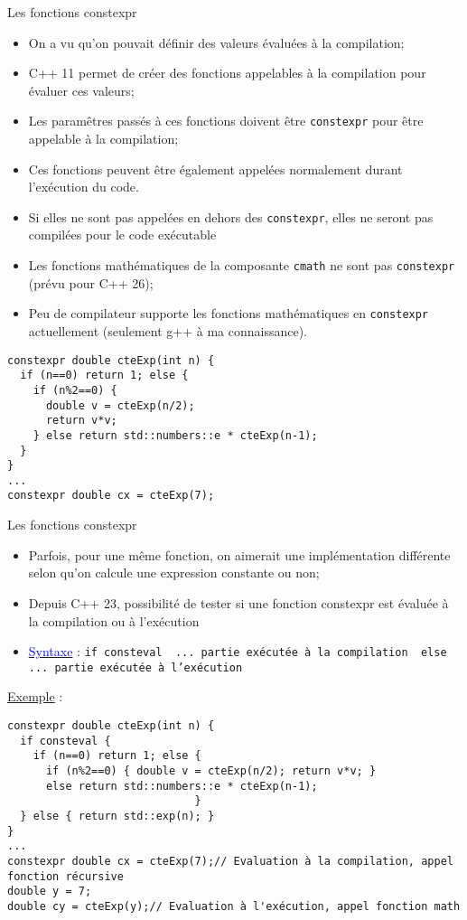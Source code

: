\documentclass[compress,10pt,aspectratio=169]{beamer}
\begin{document}
\begin{frame}[fragile]{Les fonctions constexpr}
  \scriptsize
  
\begin{itemize}
\item On a vu qu'on pouvait définir des valeurs évaluées à la compilation;
\item C++ 11 permet de créer des fonctions appelables à la compilation pour évaluer ces valeurs;
\item Les paramêtres passés à ces fonctions doivent être \texttt{constexpr} pour être appelable à la compilation;
\item Ces fonctions peuvent être également appelées normalement durant l'exécution du code. 
\item Si elles ne sont pas appelées en dehors des \texttt{constexpr}, elles ne seront pas compilées pour le code exécutable
\item Les fonctions mathématiques de la composante \texttt{cmath} ne sont pas \texttt{constexpr} (prévu pour C++ 26);
\item Peu de compilateur supporte les fonctions mathématiques en \texttt{constexpr} actuellement (seulement g++ à ma connaissance).
\end{itemize}

\begin{verbatim}
constexpr double cteExp(int n) {
  if (n==0) return 1; else {
    if (n%2==0) {
      double v = cteExp(n/2);
      return v*v;
    } else return std::numbers::e * cteExp(n-1);
  }
}
...   
constexpr double cx = cteExp(7);
\end{verbatim}

\end{frame}
  
\begin{frame}[fragile]{Les fonctions constexpr}
  \scriptsize
  
  \begin{itemize}
\item Parfois, pour une même fonction, on aimerait une implémentation différente selon qu'on calcule une expression constante ou non;
\item Depuis C++ 23, possibilité de tester si une fonction constexpr est évaluée à la compilation ou à l'exécution
\item \underline{\textcolor{blue}{Syntaxe}} : \texttt{if consteval { ... partie exécutée à la compilation } else { ... partie exécutée à l'exécution }}
  \end{itemize}

  \underline{Exemple} : 
  \begin{verbatim}
constexpr double cteExp(int n) {
  if consteval {
    if (n==0) return 1; else {
      if (n%2==0) { double v = cteExp(n/2); return v*v; } 
      else return std::numbers::e * cteExp(n-1);
                             }
  } else { return std::exp(n); }
}
...   
constexpr double cx = cteExp(7);// Evaluation à la compilation, appel fonction récursive
double y = 7;
double cy = cteExp(y);// Evaluation à l'exécution, appel fonction math
    \end{verbatim}
    
\end{frame}
\end{document}
